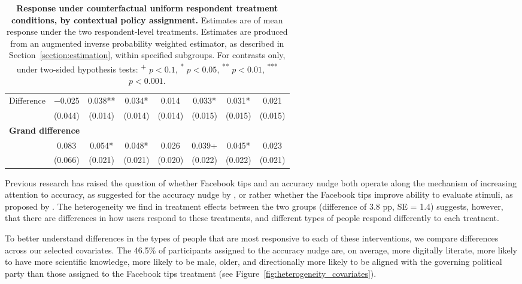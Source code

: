 \documentclass[letterpaper, 12pt, parskip=full,DIV=10]{scrartcl}
\begin{document}
\begin{table}[H]
{\begin{tabular}{lccccccc}
   \cmidrule(lr){2-8}
 \hspace{1em} Difference & \num{-0.025}& \num{0.038}** & \num{0.034}* & \num{0.014} & \num{0.033}* & \num{0.031}* & \num{0.021}\\
  & (\num{0.044})& (\num{0.014}) & (\num{0.014}) & (\num{0.014}) & (\num{0.015}) & (\num{0.015}) & (\num{0.015})\\
\hline
\multicolumn{4}{l}{\textbf{Grand difference}} \rule{0pt}{1.2\normalbaselineskip} \\
& \num{0.083}&   \num{0.054}* & \num{0.048}* & \num{0.026} & \num{0.039}+ & \num{0.045}* & \num{0.023}\\
  & (\num{0.066}) & (\num{0.021}) & (\num{0.021}) & (\num{0.020}) & (\num{0.022}) & (\num{0.022}) & (\num{0.021})\\
   \end{tabular}
   }
   \caption{\textbf{Response under counterfactual uniform respondent treatment conditions, by contextual policy assignment.} Estimates are of mean response under the two respondent-level treatments. Estimates are produced from an augmented inverse probability weighted estimator, as described in Section~\ref{section:estimation}, within specified subgroups. For contrasts only, under two-sided hypothesis tests: \textsuperscript{+} $p<0.1$, \textsuperscript{*} $p < 0.05$, \textsuperscript{**} $p < 0.01$, \textsuperscript{***} $p < 0.001$.}
   \label{tab:heterogeneity_best}
\end{table}


Previous research has raised the question of %
whether Facebook tips and an accuracy nudge both operate along the mechanism of increasing attention to accuracy,  as suggested for the accuracy nudge by \cite{pennycook_epstein_mosleh_arechar_eckles_rand_2019}, 
or rather whether the Facebook tips improve ability to evaluate stimuli, as proposed by \cite{guessetal2020digital}. The heterogeneity we find in treatment effects between the two groups (difference of 3.8 pp, SE = 1.4) suggests, however, that there are differences in how users respond to these treatments, and different types of people respond differently to each treatnent. 

To better understand differences in the types of people that are most responsive to each of these interventions, we compare differences across our selected covariates. 
The 46.5\% of participants assigned to the accuracy nudge %
are, on average, more digitally literate, more likely to have more scientific knowledge,
more likely to be male, older, and directionally more likely to be aligned with the governing political party than those assigned to the Facebook tips treatment (see Figure~\ref{fig:heterogeneity_covariates}).
\end{document}

